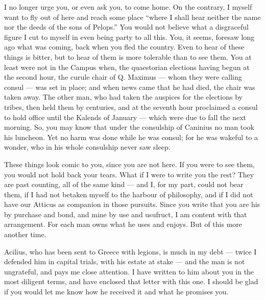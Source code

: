 

 I no longer urge you, or even ask you, to come home. On the contrary, I myself want to fly out of here and reach some place ``where I shall hear neither the name nor the deeds of the sons of Pelops.'' You would not believe what a disgraceful figure I cut to myself in even being party to all this. You, it seems, foresaw long ago what was coming, back when you fled the country. Even to hear of these things is bitter, but to hear of them is more tolerable than to see them. You at least were not in the Campus when, the quaestorian elections having begun at the second hour, the curule chair of Q. Maximus --- whom they were calling consul --- was set in place; and when news came that he had died, the chair was taken away. The other man, who had taken the auspices for the elections by tribes, then held them by centuries, and at the seventh hour proclaimed a consul to hold office until the Kalends of January --- which were due to fall the next morning. So, you may know that under the consulship of Caninius no man took his luncheon. Yet no harm was done while he was consul; for he was wakeful to a wonder, who in his whole consulship never saw sleep.

 These things look comic to you, since you are not here. If you were to see them, you would not hold back your tears. What if I were to write you the rest? They are past counting, all of the same kind --- and I, for my part, could not bear them, if I had not betaken myself to the harbour of philosophy, and if I did not have our Atticus as companion in those pursuits. Since you write that you are his by purchase and bond, and mine by use and usufruct, I am content with that arrangement. For each man owns what he uses and enjoys. But of this more another time.

 Acilius, who has been sent to Greece with legions, is much in my debt --- twice I defended him in capital trials, with his estate at stake --- and the man is not ungrateful, and pays me close attention. I have written to him about you in the most diligent terms, and have enclosed that letter with this one. I should be glad if you would let me know how he received it and what he promises you.
